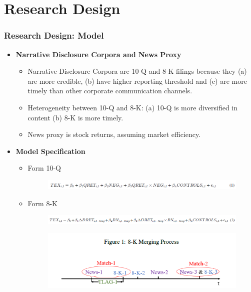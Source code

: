 \documentclass{beamer}
\begin{document}
\section{Research Design}
\begin{frame}
\frametitle{Research Design: Model}
\begin{itemize}

\item \textbf{Narrative Disclosure Corpora and News Proxy}

\begin{itemize}
	\item Narrative Disclosure Corpora are 10-Q and 8-K filings because they (a) are more credible, (b) have higher reporting threshold and (c) are more timely than other corporate communication channels.
	\item Heterogeneity between 10-Q and 8-K: (a) 10-Q is more diversified in content (b) 8-K is more timely.
	\item News proxy is stock returns, assuming market efficiency.
\end{itemize}

\item \textbf{Model Specification}
	\begin{itemize}
		\item Form 10-Q
		
		\begin{figure}[h]
			\centering
			\includegraphics[width=0.75\linewidth]{eq1}
			\label{eq1}
		\end{figure}
	
		\item Form 8-K
		
		\begin{figure}[h]
			\centering
			\includegraphics[width=0.8\linewidth]{eq3}
			\label{eq3}
		\end{figure}
	
		\begin{figure}[h]
			\centering
			\includegraphics[width=0.6\linewidth]{fig1}
			\label{fig1}
		\end{figure}
	\end{itemize}

\end{itemize}
\end{frame}
\end{document}
